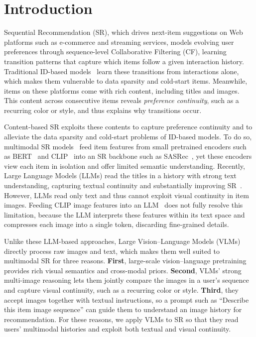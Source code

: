 \section{Introduction}
\label{sec:intro}
Sequential Recommendation (SR), which drives next-item suggestions on Web platforms such as e-commerce and streaming services, models evolving user preferences through sequence-level Collaborative Filtering (CF), learning transition patterns that capture which items follow a given interaction history.
Traditional ID-based models~\cite{sasrec,gru4rec,fmlp} learn these transitions from interactions alone, which makes them vulnerable to data sparsity and cold-start items.
Meanwhile, items on these platforms come with rich content, including titles and images.
This content across consecutive items reveals \textit{preference continuity}, such as a recurring color or style, and thus explains why transitions occur.

Content-based SR exploits these contents to capture preference continuity and to alleviate the data sparsity and cold-start problems of ID-based models.
To do so, multimodal SR models~\cite{mmrec1,modrec_m3srec,modrec_hm4sr} feed item features from small pretrained encoders such as BERT~\cite{bert} and CLIP~\cite{clip} into an SR backbone such as SASRec~\cite{sasrec}, yet these encoders view each item in isolation and offer limited semantic understanding.
Recently, Large Language Models (LLMs) read the titles in a history with strong text understanding, capturing textual continuity and substantially improving SR~\cite{slim,llm2rec}.
However, LLMs read only text and thus cannot exploit visual continuity in item images.
Feeding CLIP image features into an LLM~\cite{illmrec} does not fully resolve this limitation, because the LLM interprets these features within its text space and compresses each image into a single token, discarding fine-grained details.

Unlike these LLM-based approaches, Large Vision--Language Models (VLMs)~\cite{qwen2.5-vl,internvl3} directly process raw images and text, which makes them well suited to multimodal SR for three reasons.
\textbf{First}, large-scale vision--language pretraining provides rich visual semantics and cross-modal priors.
\textbf{Second}, VLMs' strong multi-image reasoning lets them jointly compare the images in a user's sequence and capture visual continuity, such as a recurring color or style.
\textbf{Third}, they accept images together with textual instructions, so a prompt such as ``Describe this item image sequence'' can guide them to understand an image history for recommendation.
For these reasons, we apply VLMs to SR so that they read users' multimodal histories and exploit both textual and visual continuity.

